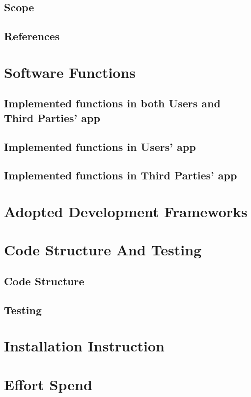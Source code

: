 \documentclass[a4paper,12pt]{report}
\begin{document}
	\section{Scope}
	

	\section{References}
	

	\chapter{Software Functions}
	\label{ch: Software_Functions}

	\section{Implemented functions in both Users and Third Parties' app }
	

	\section{Implemented functions in Users' app}
	

	\section{Implemented functions in Third Parties' app}
	


	\chapter{Adopted Development Frameworks}
	\label{ch: Adopted_Development_Frameworks}
	


	\chapter{Code Structure And Testing} 
	\label{ch:Code_Structure}

	\section{Code Structure}
	

	\section{Testing}
	

	\chapter{Installation Instruction} 
	\label{ch: Installation_Instruction}
	

	\appendix
	\chapter{Effort Spend}
	
\end{document}
